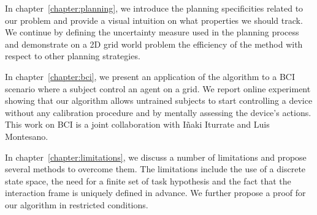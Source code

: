 In chapter~\ref{chapter:planning}, we introduce the planning specificities related to our problem and provide a visual intuition on what properties we should track. We continue by defining the uncertainty measure used in the planning process and demonstrate on a 2D grid world problem the efficiency of the method with respect to other planning strategies.

In chapter~\ref{chapter:bci}, we present an application of the algorithm to a BCI scenario where a subject control an agent on a grid. We report online experiment showing that our algorithm allows untrained subjects to start controlling a device without any calibration procedure and by mentally assessing the device's actions. This work on BCI is a joint collaboration with I{\~n}aki Iturrate and Luis Montesano.

In chapter~\ref{chapter:limitations}, we discuss a number of limitations and propose several methods to overcome them. The limitations include the use of a discrete state space, the need for a finite set of task hypothesis and the fact that the interaction frame is uniquely defined in advance. We further propose a proof for our algorithm in restricted conditions.
